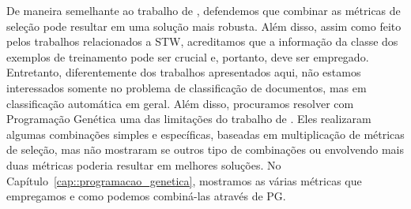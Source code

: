 De maneira semelhante ao trabalho de \cite{Tang05}, defendemos que combinar as métricas de seleção pode resultar em uma solução mais robusta. Além disso, assim como feito pelos trabalhos relacionados a \textsc{STW}, acreditamos que a informação da classe dos exemplos de treinamento pode ser crucial e, portanto, deve ser empregado.
Entretanto, diferentemente dos trabalhos apresentados aqui, não estamos interessados somente no problema de classificação de documentos, mas em classificação automática em geral. 
Além disso, procuramos resolver com Programação Genética uma das limitações do trabalho de \cite{Tang05}. Eles realizaram algumas combinações simples e específicas, baseadas em multiplicação de métricas de seleção, mas não mostraram se outros tipo de combinações ou envolvendo mais duas métricas poderia resultar em melhores soluções. No Capítulo~\ref{cap::programacao_genetica}, mostramos as várias métricas que empregamos e como podemos combiná-las através de \textsc{PG}. 




